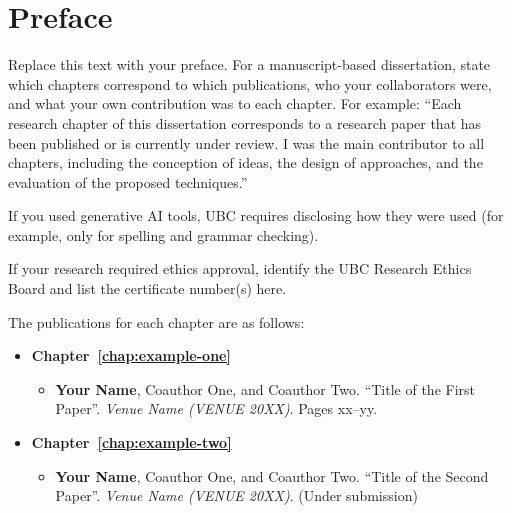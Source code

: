 

\chapter{Preface}

Replace this text with your preface.  For a manuscript-based
dissertation, state which chapters correspond to which publications,
who your collaborators were, and what your own contribution was to
each chapter.  For example: ``Each research chapter of this
dissertation corresponds to a research paper that has been published
or is currently under review.  I was the main contributor to all
chapters, including the conception of ideas, the design of
approaches, and the evaluation of the proposed techniques.''

If you used generative AI tools, UBC requires disclosing how they
were used (for example, only for spelling and grammar checking).

If your research required ethics approval, identify the UBC Research
Ethics Board and list the certificate number(s) here.

The publications for each chapter are as follows:

\begin{itemize}

\item \textbf{Chapter~\ref{chap:example-one}}
\begin{itemize}
\item \textbf{Your Name}, Coauthor One, and Coauthor Two. ``Title of
the First Paper''. \emph{Venue Name (VENUE 20XX)}. Pages xx--yy.
\end{itemize}

\item \textbf{Chapter~\ref{chap:example-two}}
\begin{itemize}
\item \textbf{Your Name}, Coauthor One, and Coauthor Two. ``Title of
the Second Paper''. \emph{Venue Name (VENUE 20XX)}. (Under submission)
\end{itemize}

\end{itemize}
